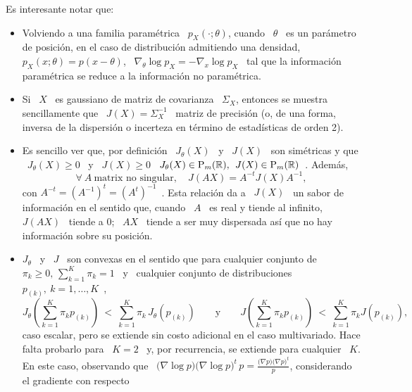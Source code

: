 Es interesante notar que:
%
\begin{itemize}
\item Volviendo a una familia param\'etrica \ $p_X(\cdot;\theta)$, cuando \ $\theta$ \
es un  par\'ametro de posici\'on,  en el  caso de distribuci\'on  admitiendo una
densidad,  \ $p_X(x;\theta)  =  p(x  - \theta)$,  \  $\nabla_\theta  \log p_X  =
- \nabla_x \log  p_X$ \ tal  que la informaci\'on  param\'etrica se reduce  a la
informaci\'on no param\'etrica.
%
\item Si \ $X$ \ es gaussiano  de matriz de covarianza \ $\Sigma_X$, entonces se
  muestra sencillamente que \ $J(X) = \Sigma_X^{-1}$ \ matriz de precisi\'on (o,
  de  una  forma,  inversa  de  la dispersi\'on  o  incerteza  en  t\'ermino  de
  estad\'isticas de orden 2).
%
\item Es sencillo ver  que, por definici\'on \ $J_\theta(X)$ \ y  \ $J(X)$ \ son
  sim\'etricas y que \ $J_\theta(X) \ge 0$ \ y \ $J(X) \ge 0$ \ \ie $J_\theta(X) \in
  \mathrm{P}_m(\mathbb{R}), \:\: J(X) \in \mathrm{P}_m(\mathbb{R})$~\cite{LehCas98}.  Adem\'as,
  \[
  \forall \ A \ \mbox{matrix no singular}, \quad J(AX) = A^{-t} J(X) A^{-1},
  \]
  con   $A^{-t}  =   \left(   A^{-1}  \right)^t   =   \left(  A^t   \right)^{-1}
  $~\cite{CovTho06, DemCov91, Bar86}.  Esta relaci\'on  da a \ $J(X)$ \ un sabor
  de  informaci\'on en  el sentido  que, cuando  \  $A$ \  es real  y tiende  al
  infinito, \ $J(AX)$ \ tiende a 0; \  $A X$ \ tiende a ser muy dispersada as\'i
  que no hay informaci\'on sobre su posici\'on.
%
\item $J_\theta$  \ y  \ $J$  \ son convexas  en el  sentido que  para cualquier
  conjunto  de \  $\pi_k \ge  0, \,  \sum_{k=1}^K  \pi_k =  1$ \  y \  cualquier
  conjunto  de distribuciones  \ $p_{(k)},  \ k  = 1,  \ldots  , K$~\cite{Coh68,
    Fri04},
  \[
  J_\theta\left(  \sum_{k=1}^K  \pi_k  p_{(k)}  \right)  \:  <  \:  \sum_{k=1}^K
  \pi_k  \,  J_\theta\left(  p_{(k)}  \right)  \qquad  \mbox{y}  \qquad  J\left(
    \sum_{k=1}^K \pi_k  p_{(k)} \right) \:  < \: \sum_{k=1}^K  \pi_k J\left(
    p_{(k)} \right),
  \]
  caso escalar,  pero se extiende sin  costo adicional en el  caso multivariado.
  Hace  falta probarlo  para \  $K=2$  \ y,  por recurrencia,  se extiende  para
  cualquier  \  $K$.  En  este  caso,   observando  que  \  $\big(  \nabla  \log
  p   \big)  \big(   \nabla  \log   p  \big)^t   \,  p   =  \frac{\big(   \nabla
  p \big)  \big( \nabla p  \big)^t}{p}$, considerando el gradiente  con respecto

\end{itemize}
